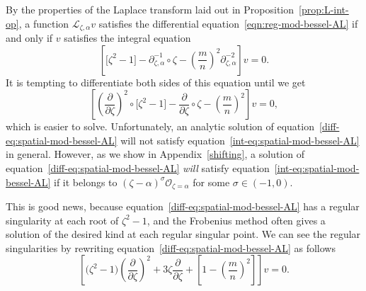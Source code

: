\documentclass[10pt,a4paper]{amsart}
\newcommand{\fracderiv}[3]{\partial^{#1}_{#2, #3}}
\newcommand{\laplace}{\mathcal{L}}
\numberwithin{equation}{section}
\begin{document}
By the properties of the Laplace transform laid out in Proposition~\ref{prop:L-int-op}, a function $\laplace_{\zeta, \alpha} v$ satisfies the differential equation~\eqref{eqn:reg-mod-bessel-AL} if and only if $v$ satisfies the integral equation
\begin{equation}\label{int-eq:spatial-mod-bessel-AL}
\left[ \bigl[ \zeta^2 - 1 \bigr] - \fracderiv{-1}{\zeta}{\alpha} \circ \zeta - \left(\frac{m}{n}\right)^2 \fracderiv{-2}{\zeta}{\alpha} \right] v = 0.
\end{equation}
It is tempting to differentiate both sides of this equation until we get
\begin{equation}\label{diff-eq:spatial-mod-bessel-AL}
\left[ \left(\frac{\partial}{\partial \zeta}\right)^2 \circ \bigl[ \zeta^2 - 1 \bigr] - \frac{\partial}{\partial \zeta} \circ \zeta - \left(\frac{m}{n}\right)^2 \right] v = 0,
\end{equation}
which is easier to solve. Unfortunately, an analytic solution of equation~\eqref{diff-eq:spatial-mod-bessel-AL} will not satisfy equation~\eqref{int-eq:spatial-mod-bessel-AL} in general. However, as we show in Appendix~\ref{shifting}, a solution of equation~\eqref{diff-eq:spatial-mod-bessel-AL} {\em will} satisfy equation~\eqref{int-eq:spatial-mod-bessel-AL} if it belongs to $(\zeta - \alpha)^\sigma \mathcal{O}_{\zeta = \alpha}$ for some $\sigma \in (-1, 0)$.

This is good news, because equation~\eqref{diff-eq:spatial-mod-bessel-AL} has a regular singularity at each root of $\zeta^2 - 1$, and the Frobenius method often gives a solution of the desired kind at each regular singular point. We can see the regular singularities by rewriting equation~\eqref{diff-eq:spatial-mod-bessel-AL} as follows
\[ \left[ \bigl(\zeta^2 - 1\bigr) \left(\frac{\partial}{\partial \zeta}\right)^2 + 3\zeta \frac{\partial}{\partial \zeta} + \left[ 1 - \left(\frac{m}{n}\right)^2 \right] \right] v = 0. \]
\end{document}
